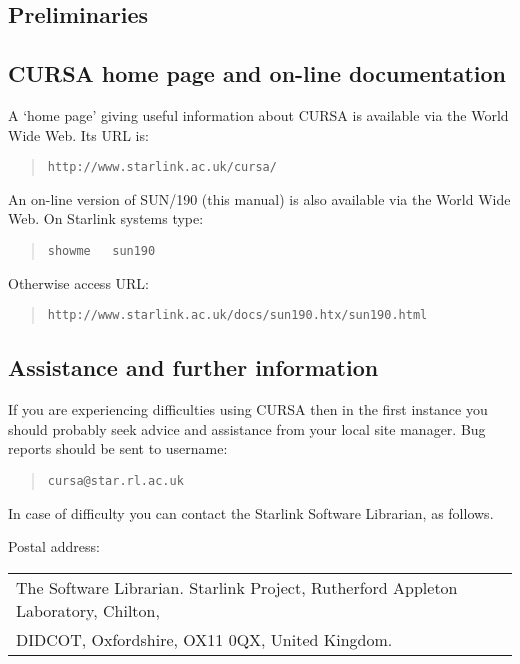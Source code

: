 \documentclass[twoside,11pt]{article}
\newcommand{\htmladdnormallink}[2]{#1}
\renewcommand{\_}{\texttt{\symbol{95}}}
\begin{document}
\begin{htmlonly}
\section*{Preliminaries}
\end{htmlonly} 

\subsection*{CURSA home page and on-line documentation}
\label{HOMEPAGE}

A `home page' giving useful information about CURSA is available via
the World Wide Web. Its URL is:

\begin{quote}
\htmladdnormallink{ {\tt http://www.starlink.ac.uk/cursa/}}
{http://www.starlink.ac.uk/cursa/}
\end{quote}

An on-line version of SUN/190 (this manual) is also available via the
World Wide Web.  On Starlink systems type:

\begin{quote}
{\tt showme ~ sun190}
\end{quote}

Otherwise access URL:

\begin{quote}
\htmladdnormallink{
{\tt http://www.starlink.ac.uk/docs/sun190.htx/sun190.html}}
{http://www.starlink.ac.uk/docs/sun190.htx/sun190.html}
\end{quote}


\subsection*{Assistance and further information}

If you are experiencing difficulties using CURSA then in the first
instance you should probably seek advice and assistance from your local
site manager.  Bug reports should be sent to username:

\begin{quote}
{\tt cursa@star.rl.ac.uk}
\end{quote}

In case of difficulty you can contact the Starlink Software
Librarian, as follows.

Postal address: \\
\begin{tabular}{l}
The Software Librarian. Starlink Project, Rutherford Appleton Laboratory, 
  Chilton, \\
DIDCOT, Oxfordshire, OX11 0QX, United Kingdom.                \\
\end{tabular}
\end{document}

